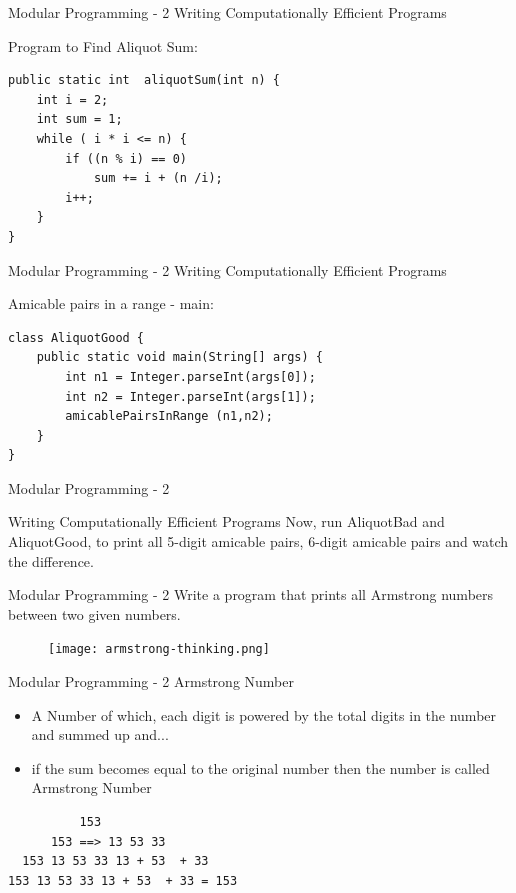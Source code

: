 \documentclass[14pt]{beamer}
\begin{document}
\begin{frame}[fragile]{Modular Programming - 2}
Writing Computationally Efficient Programs 
\begin{block}{Program to Find Aliquot Sum:}
\begin{lstlisting}[numbers=none]
public static int  aliquotSum(int n) {
    int i = 2;
    int sum = 1;
    while ( i * i <= n) {
        if ((n % i) == 0)
            sum += i + (n /i);
        i++;
    }
}
\end{lstlisting}
\end{block}
\end{frame}

\begin{frame}[fragile]{Modular Programming - 2}
Writing Computationally Efficient Programs 
\begin{block}{Amicable pairs in a range - main:}
\begin{lstlisting}[numbers=none]
class AliquotGood {
    public static void main(String[] args) {
        int n1 = Integer.parseInt(args[0]);
        int n2 = Integer.parseInt(args[1]);
        amicablePairsInRange (n1,n2);
    }	
}
\end{lstlisting}
\end{block}
\end{frame}

\begin{frame}{Modular Programming - 2}
\begin{block}{Writing Computationally Efficient Programs}
Now, run AliquotBad and AliquotGood, to print all 5-digit amicable pairs, 6-digit amicable pairs and watch the difference.
\end{block}
\end{frame}

\begin{frame}{Modular Programming - 2}
Write a program that prints all Armstrong numbers between two given numbers.
\begin{figure}[H]
\begin{center}
\texttt{[image: armstrong-thinking.png]}
\end{center}
\end{figure}
\end{frame}

\begin{frame}[fragile]{Modular Programming - 2}
Armstrong Number
\begin{itemize}
\item A Number of which, each digit is powered by the total digits in the number and summed up and... \item if the sum becomes equal to the original number then the number is called Armstrong Number
\end{itemize}
\begin{verbatim}
          153
      153 ==> 13 53 33
  153 13 53 33 13 + 53  + 33
153 13 53 33 13 + 53  + 33 = 153 
\end{verbatim}
\end{frame}
\end{document}
